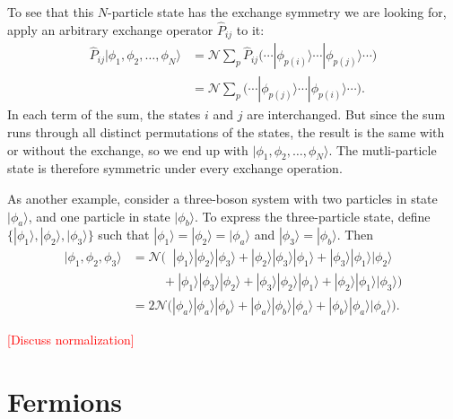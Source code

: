 \documentclass[pra,12pt]{revtex4}
\begin{document}
To see that this $N$-particle state has the exchange symmetry we are
looking for, apply an arbitrary exchange operator $\hat{P}_{ij}$ to it:
$$\begin{aligned}\hat{P}_{ij}|\phi_1,\phi_2,\dots,\phi_N\rangle &= \mathcal{N} \sum_p \hat{P}_{ij} \Big(\cdots  |\phi_{p(i)}\rangle  \cdots  |\phi_{p(j)}\rangle\cdots\Big) \\&= \mathcal{N} \sum_p \Big(\cdots  |\phi_{p(j)}\rangle  \cdots  |\phi_{p(i)}\rangle\cdots\Big).\end{aligned}$$
In each term of the sum, the states $i$ and $j$ are interchanged.  But
since the sum runs through all distinct permutations of the states,
the result is the same with or without the exchange, so we end up with
$|\phi_1,\phi_2,\dots,\phi_N\rangle$.  The mutli-particle state is
therefore symmetric under every exchange operation.

As another example, consider a three-boson system with two particles
in state $|\phi_a\rangle$, and one particle in state $|\phi_b\rangle$.
To express the three-particle state, define $\{|\phi_1\rangle,
|\phi_2\rangle, |\phi_3\rangle\}$ such that $|\phi_1\rangle =
|\phi_2\rangle = |\phi_a\rangle$ and $|\phi_3\rangle =
|\phi_b\rangle$.  Then
$$\begin{aligned}|\phi_1,\phi_2,\phi_3\rangle &= \mathcal{N} \Big( \;\;
|\phi_1\rangle|\phi_2\rangle|\phi_3\rangle +
|\phi_2\rangle|\phi_3\rangle|\phi_1\rangle +
|\phi_3\rangle|\phi_1\rangle|\phi_2\rangle \\ &\qquad\;\, +
|\phi_1\rangle|\phi_3\rangle|\phi_2\rangle +
|\phi_3\rangle|\phi_2\rangle|\phi_1\rangle +
|\phi_2\rangle|\phi_1\rangle|\phi_3\rangle\Big) \\
&= 2\mathcal{N} \Big(
|\phi_a\rangle|\phi_a\rangle|\phi_b\rangle +
|\phi_a\rangle|\phi_b\rangle|\phi_a\rangle +
|\phi_b\rangle|\phi_a\rangle|\phi_a\rangle\Big).
\end{aligned}$$

\textcolor{red}{[Discuss normalization]}

\section{Fermions}
\end{document}

